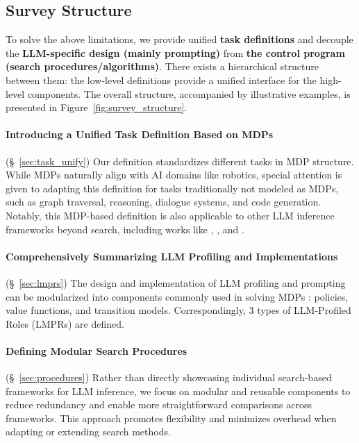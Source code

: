 \subsection{Survey Structure}
To solve the above limitations, we provide unified \textbf{task definitions} and decouple the \textbf{LLM-specific design (mainly prompting)} from \textbf{the control program (search procedures/algorithms)}. There exists a hierarchical structure between them: the low-level definitions provide a unified interface for the high-level components. The overall structure, accompanied by illustrative examples, is presented in Figure~\ref{fig:survey_structure}.


\paragraph{Introducing a Unified Task Definition Based on MDPs} 
(\S~\ref{sec:task_unify}) 
Our definition standardizes different tasks in MDP structure.
While MDPs naturally align with AI domains like robotics, special attention is given to adapting this definition for tasks traditionally not modeled as MDPs, such as graph traversal, reasoning, dialogue systems, and code generation. Notably, this MDP-based definition is also applicable to other LLM inference frameworks beyond search, including works like \citet{li2022pretrained}, \citet{zhao2023large}, and \citet{hu2024treeplanner}.  

\paragraph{Comprehensively Summarizing LLM Profiling and Implementations} 
(\S~\ref{sec:lmprs})
The design and implementation of LLM profiling and prompting can be modularized into components commonly used in solving MDPs \citep{sutton2018reinforcement}: policies, value functions, and transition models. Correspondingly, 3 types of LLM-Profiled Roles (LMPRs) are defined.

\paragraph{Defining Modular Search Procedures} (\S~\ref{sec:procedures})
Rather than directly showcasing individual search-based frameworks for LLM inference, we focus on modular and reusable components to reduce redundancy and enable more straightforward comparisons across frameworks. This approach promotes flexibility and minimizes overhead when adapting or extending search methods.

